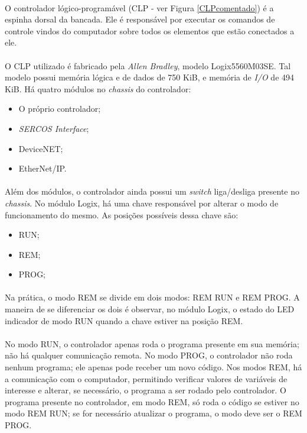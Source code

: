 \documentclass[a4paper,11pt]{scrartcl} %
\numberwithin{equation}{section} %
\numberwithin{figure}{section} %
\numberwithin{table}{section} %
\begin{document}
\paragraph{} O controlador lógico-programável (CLP - ver Figura \ref{CLPcomentado}) é a espinha dorsal da bancada. Ele é responsável por executar os comandos de controle vindos do computador sobre todos os elementos que estão conectados a ele.
\paragraph{} O CLP utilizado é fabricado pela \textit{Allen Bradley}, modelo Logix5560M03SE. Tal modelo possui memória lógica e de dados de 750 KiB, e memória de \textit{I/O} de 494 KiB. Há quatro módulos no \textit{chassis} do controlador:
\begin{itemize}
  \item O próprio controlador;
  \item \textit{SERCOS Interface};
  \item DeviceNET;
  \item EtherNet/IP.
\end{itemize}
\paragraph{} Além dos módulos, o controlador ainda possui um \textit{switch} liga/desliga presente no \textit{chassis}. No módulo Logix, há uma chave responsável por alterar o modo de funcionamento do mesmo. As posições possíveis dessa chave são:
\begin{itemize}
  \item RUN;
  \item REM;
  \item PROG;
\end{itemize}
\paragraph{} Na prática, o modo REM se divide em dois modos: REM RUN e REM PROG. A maneira de se diferenciar os dois é observar, no módulo Logix, o estado do LED indicador de modo RUN quando a chave estiver na posição REM.
\paragraph{} No modo RUN, o controlador apenas roda o programa presente em sua memória; não há qualquer comunicação remota. No modo PROG, o controlador não roda nenhum programa; ele apenas pode receber um novo código. Nos modos REM, há a comunicação com o computador, permitindo verificar valores de variáveis de interesse e alterar, se necessário, o programa a ser rodado pelo controlador. O programa presente no controlador, em modo REM, só roda o código se estiver no modo REM RUN; se for necessário atualizar o programa, o modo deve ser o REM PROG.
\end{document}
